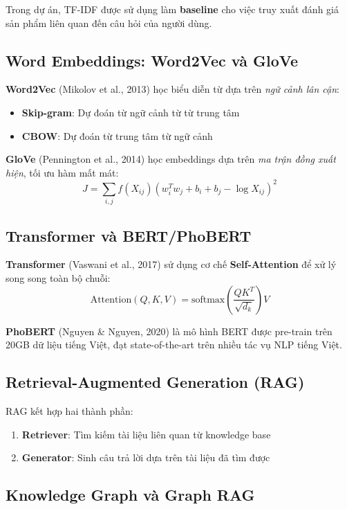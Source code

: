 \documentclass[12pt,a4paper]{article}
\begin{document}
Trong dự án, TF-IDF được sử dụng làm \textbf{baseline} cho việc truy xuất đánh giá sản phẩm liên quan đến câu hỏi của người dùng.

\subsection{Word Embeddings: Word2Vec và GloVe}

\textbf{Word2Vec} (Mikolov et al., 2013) học biểu diễn từ dựa trên \textit{ngữ cảnh lân cận}:
\begin{itemize}
  \item \textbf{Skip-gram}: Dự đoán từ ngữ cảnh từ từ trung tâm
  \item \textbf{CBOW}: Dự đoán từ trung tâm từ ngữ cảnh
\end{itemize}

\textbf{GloVe} (Pennington et al., 2014) học embeddings dựa trên \textit{ma trận đồng xuất hiện}, tối ưu hàm mất mát:
\[
  J = \sum_{i,j} f(X_{ij}) \left( w_i^T w_j + b_i + b_j - \log X_{ij} \right)^2
\]

\subsection{Transformer và BERT/PhoBERT}

\textbf{Transformer} (Vaswani et al., 2017) sử dụng cơ chế \textbf{Self-Attention} để xử lý song song toàn bộ chuỗi:
\[
  \text{Attention}(Q, K, V) = \text{softmax}\left(\frac{QK^T}{\sqrt{d_k}}\right) V
\]

\textbf{PhoBERT} (Nguyen \& Nguyen, 2020) là mô hình BERT được pre-train trên 20GB dữ liệu tiếng Việt, đạt state-of-the-art trên nhiều tác vụ NLP tiếng Việt.

\subsection{Retrieval-Augmented Generation (RAG)}

RAG kết hợp hai thành phần:
\begin{enumerate}
  \item \textbf{Retriever}: Tìm kiếm tài liệu liên quan từ knowledge base
  \item \textbf{Generator}: Sinh câu trả lời dựa trên tài liệu đã tìm được
\end{enumerate}

\subsection{Knowledge Graph và Graph RAG}
\end{document}
